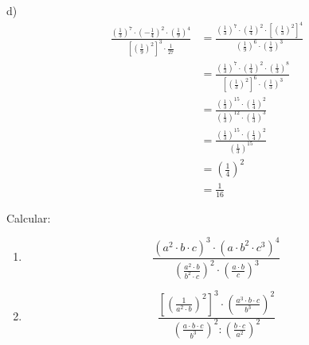 \begin{solucio}
d)%
\begin{align*}
\frac{\left( \frac{1}{3}\right) ^{7}\cdot \left( -\frac{1}{4}\right)
^{2}\cdot \left( \frac{1}{9}\right) ^{4}}{\left[ \left( \frac{1}{9}\right)
^{2}\right] ^{3}\cdot \frac{1}{27}} &=\frac{\left( \frac{1}{3}\right)
^{7}\cdot \left( \frac{1}{4}\right) ^{2}\cdot \left[ \left( \frac{1}{3}%
\right) ^{2}\right] ^{4}}{\left( \frac{1}{9}\right) ^{6}\cdot \left( \frac{1%
}{3}\right) ^{3}} \\
&=\frac{\left( \frac{1}{3}\right) ^{7}\cdot \left( \frac{1}{4}\right)
^{2}\cdot \left( \frac{1}{3}\right) ^{8}}{\left[ \left( \frac{1}{3}\right)
^{2}\right] ^{6}\cdot \left( \frac{1}{3}\right) ^{3}} \\
&=\frac{\left( \frac{1}{3}\right) ^{15}\cdot \left( \frac{1}{4}\right) ^{2}%
}{\left( \frac{1}{3}\right) ^{12}\cdot \left( \frac{1}{3}\right) ^{3}} \\
&=\frac{\left( \frac{1}{3}\right) ^{15}\cdot \left( \frac{1}{4}\right) ^{2}%
}{\left( \frac{1}{3}\right) ^{15}} \\
&=\left( \frac{1}{4}\right) ^{2} \\
&=\frac{1}{16}
\end{align*}
\end{solucio}

\begin{exercici}
Calcular:

\begin{enumerate}
\item[a)] 
\begin{equation*}
\frac{\left( a^{2}\cdot b\cdot c\right) ^{3}\cdot \left( a\cdot b^{2}\cdot
c^{3}\right) ^{4}}{\left( \frac{a^{2}\cdot b}{b^{2}\cdot c}\right) ^{2}\cdot
\left( \frac{a\cdot b}{c}\right) ^{3}}
\end{equation*}

\item[b)] 
\begin{equation*}
\frac{\left[ \left( \frac{1}{a^{2}\cdot b}\right) ^{2}\right] ^{3}\cdot
\left( \frac{a^{3}\cdot b\cdot c}{b^{3}}\right) ^{2}}{\left( \frac{a\cdot
b\cdot c}{b^{3}}\right) ^{2}:\left( \frac{b\cdot c}{a^{2}}\right) ^{2}}
\end{equation*}
\end{enumerate}

\end{exercici}

